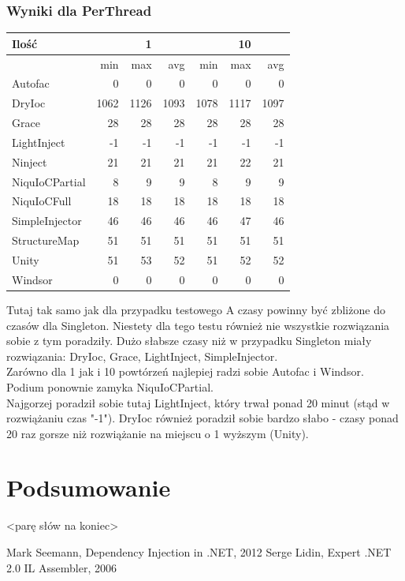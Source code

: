 \documentclass[12pt]{article}
\begin{document}
\subsubsection{Wyniki dla PerThread}
\begin{center}
\begin{small}
	\begin{tabular}{ | l | r r r | r r r | }
    		\hline
     		Ilość & & 1 & & & 10 &  \\ \hline
     		 & min & max & avg & min & max & avg \\ \hline
		Autofac & 0 & 0 & 0 & 0 & 0 & 0 \\ \hline
		DryIoc & 1062 & 1126 & 1093 & 1078 & 1117 & 1097 \\ \hline
		Grace & 28 & 28 & 28 & 28 & 28 & 28 \\ \hline
		LightInject & -1 & -1 & -1 & -1 & -1 & -1 \\ \hline
		Ninject & 21 & 21 & 21 & 21 & 22 & 21 \\ \hline
		NiquIoCPartial & 8 & 9 & 9 & 8 & 9 & 9 \\ \hline
		NiquIoCFull & 18 & 18 & 18 & 18 & 18 & 18 \\ \hline
		SimpleInjector & 46 & 46 & 46 & 46 & 47 & 46 \\ \hline
		StructureMap & 51 & 51 & 51 & 51 & 51 & 51 \\ \hline
		Unity & 51 & 53 & 52 & 51 & 52 & 52 \\ \hline
		Windsor & 0 & 0 & 0 & 0 & 0 & 0 \\
    		\hline
  	\end{tabular}
\end{small}
\end{center}
Tutaj tak samo jak dla przypadku testowego A czasy powinny być zbliżone do czasów dla Singleton. Niestety dla tego testu również nie wszystkie rozwiązania sobie z tym poradziły. Dużo słabsze czasy niż w przypadku Singleton miały rozwiązania: DryIoc, Grace, LightInject, SimpleInjector.\\
Zarówno dla 1 jak i 10 powtórzeń najlepiej radzi sobie Autofac i Windsor. Podium ponownie zamyka NiquIoCPartial.\\
Najgorzej poradził sobie tutaj LightInject, który trwał ponad 20 minut (stąd w rozwiążaniu czas "-1"). DryIoc również poradził sobie bardzo słabo - czasy ponad 20 raz gorsze niż rozwiążanie na miejscu o 1 wyższym (Unity).


\clearpage

\section{Podsumowanie}
<parę słów na koniec>

\newpage
\begin{thebibliography}{authordate1}
 Mark Seemann, Dependency Injection in .NET, 2012
 Serge Lidin, Expert .NET 2.0 IL Assembler, 2006
\end{thebibliography}
\end{document}
